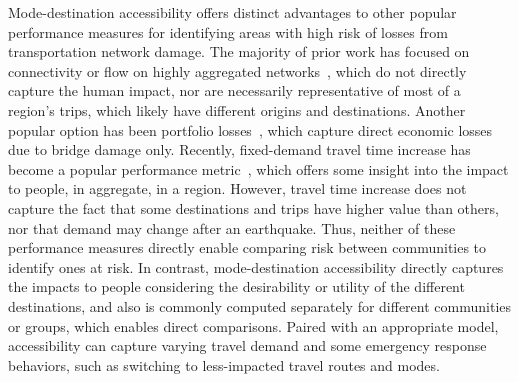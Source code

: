 Mode-destination accessibility offers distinct advantages to other popular performance measures for identifying areas with high risk of losses from transportation network damage. The majority of prior work has focused on connectivity or flow on highly aggregated networks~\cite[e.g.,][]{lee_post-hazard_2011,xxx}, which do not directly capture the human impact, nor are necessarily representative of most of a region's trips, which likely have different origins and destinations.  Another popular option has been portfolio losses~\cite[e.g.,][]{padgett_regional_2010}, which capture direct economic losses due to bridge damage only. Recently, fixed-demand travel time increase has become a popular performance metric~\cite[e.g.,][]{kiremidjian_seismic_2007,jayaram_efficient_2010}, which offers some insight into the impact to people, in aggregate, in a region. However, travel time increase does not capture the fact that some destinations and trips have higher value than others, nor that demand may change after an earthquake. Thus, neither of these performance measures directly enable comparing risk between communities to identify ones at risk. In contrast, mode-destination accessibility directly captures the impacts to people considering the desirability or utility of the different destinations, and also is commonly computed separately for different communities or groups, which enables direct comparisons.
Paired with an appropriate model, accessibility can capture varying travel demand and some emergency response behaviors, such as switching to less-impacted travel routes and modes.

